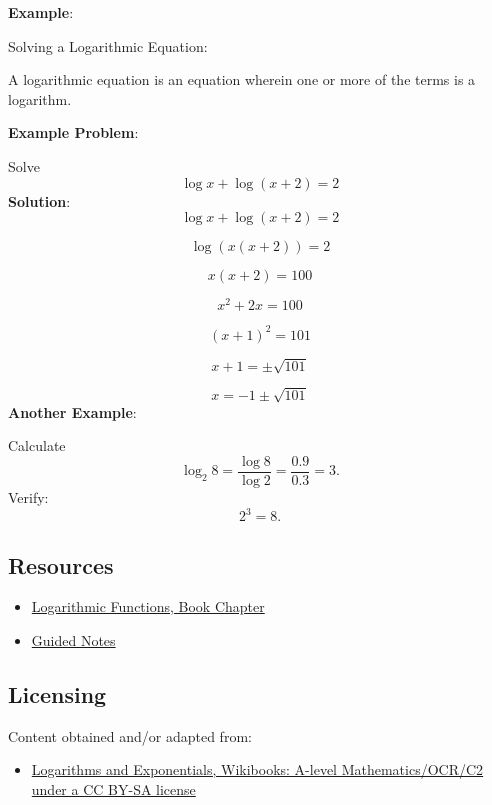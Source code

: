 \textbf{Example}:

Solving a Logarithmic Equation:

A logarithmic equation is an equation wherein one or more of the terms is a logarithm.

\textbf{Example Problem}:

Solve
\[
\log x + \log(x+2) = 2
\]
\textbf{Solution}:
\[
\log x + \log(x+2) = 2
\]

\[
\log (x(x+2)) = 2
\]

\[
x(x+2) = 100
\]

\[
x^2 + 2x = 100
\]

\[
(x+1)^2 = 101
\]

\[
x+1 = \pm \sqrt{101}
\]

\[
x = -1 \pm \sqrt{101}
\]
\textbf{Another Example}:

Calculate
\[
\log_2 8 = \frac{\log 8}{\log 2} = \frac{0.9}{0.3} = 3.
\]
Verify:
\[
2^3 = 8.
\]

\subsection{Resources}
\label{sss:reso-55b5}

\begin{itemize}
    \item \href{https://mathresearch.utsa.edu/wikiFiles/MAT1053/Logarithmic_Functions/MAT1053_M5.2Logarithmic_Functions.pdf}{Logarithmic Functions, Book Chapter}
    \item \href{https://mathresearch.utsa.edu/wikiFiles/MAT1053/Logarithmic_Functions/MAT1053_M5.2Logarithmic_FunctionsGN.pdf}{Guided Notes}
\end{itemize}

\subsection{Licensing}
\label{sss:lice-7352}

Content obtained and/or adapted from:

\begin{itemize}
    \item \href{https://en.wikibooks.org/wiki/A-level_Mathematics/OCR/C2/Logarithms_and_Exponentials}{Logarithms and Exponentials, Wikibooks: A-level Mathematics/OCR/C2 under a CC BY-SA license}
\end{itemize}

